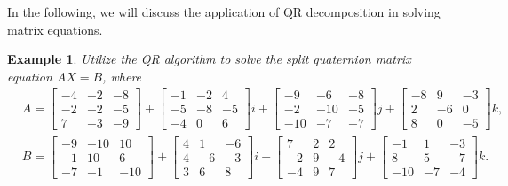 \documentclass[3p]{elsarticle}
\newtheorem{example}[theorem]{Example}
\numberwithin{equation}{section}
\begin{document}
\iffalse
In the following, we will discuss the application of QR decomposition in solving matrix equations.
\begin{example}
Utilize the QR algorithm to solve the split quaternion matrix equation $AX = B$, where
\begin{align*}
  & A =
    \begin{bmatrix}
    -4 & -2 & -8 \\
    -2 & -2 & -5 \\
     7 & -3 & -9
    \end{bmatrix} +
    \begin{bmatrix}
    -1 & -2 &  4 \\
    -5 & -8 & -5 \\
    -4 &  0 &  6
    \end{bmatrix} i 
    + 
    \begin{bmatrix}
    -9  & -6  & -8 \\
    -2  & -10 & -5 \\
    -10 & -7  & -7
    \end{bmatrix} j +
    \begin{bmatrix}
    -8 &  9 & -3 \\
     2 & -6 &  0 \\
     8 &  0 & -5
    \end{bmatrix} k,\\
  & B =
    \begin{bmatrix}
    -9 & -10 &  10 \\
    -1 &  10 &  6 \\
    -7 & -1  & -10
    \end{bmatrix} +
    \begin{bmatrix}
    4 &  1 & -6 \\
    4 & -6 & -3 \\
    3 &  6 &  8
    \end{bmatrix} i 
    +
    \begin{bmatrix}
     7 & 2 &  2 \\
    -2 & 9 & -4 \\
    -4 & 9 &  7
    \end{bmatrix} j +
    \begin{bmatrix}
    -1 &   1 & -3 \\
     8 &   5 & -7 \\
    -10 & -7 & -4
    \end{bmatrix} k.
\end{align*}
\end{example}  
\end{document}
